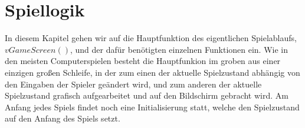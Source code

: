 
\chapter{Spiellogik}
\label{Spiel_Logik}
%
In diesem Kapitel gehen wir auf die Hauptfunktion des eigentlichen Spielablaufs, \\ $vGameScreen()$, und der daf{\"u}r ben{\"o}tigten einzelnen Funktionen ein. Wie in den meisten Computerspielen besteht die Hauptfunkion im groben aus einer einzigen gro{\ss}en Schleife, in der zum einen der aktuelle Spielzustand abh{\"a}ngig von den Eingaben der Spieler ge{\"a}ndert wird, und zum anderen der aktuelle Spielzustand grafisch aufgearbeitet und auf den Bildschirm gebracht wird. Am Anfang jedes Spiels findet noch eine Initialisierung statt, welche den Spielzustand auf den Anfang des Spiels setzt.
%

